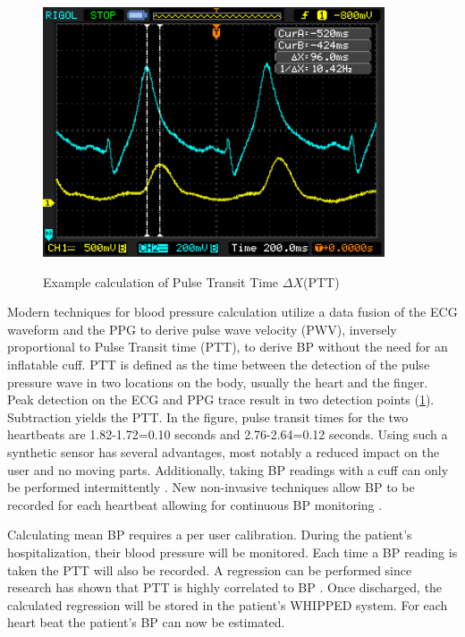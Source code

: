 \begin{figure}
	\begin{center}
		\label{fig:PTT_calc}
		\includegraphics[scale=1,width=0.9\textwidth]{Images/PTT_Calculation.png} 
		\caption{Example calculation of Pulse Transit Time $ \Delta X $(PTT)}
	\end{center}
\end{figure}

Modern techniques for blood pressure calculation utilize a data fusion of the ECG waveform and the PPG to derive pulse wave velocity (PWV), inversely proportional to Pulse Transit time (PTT), to derive BP without the need for an inflatable cuff.  PTT is defined as the time between the detection of the pulse pressure wave in two locations on the body, usually the heart and the finger. Peak detection on the ECG and PPG trace result in two detection points (\cref{fig:PTT_calc}). Subtraction yields the PTT. In the figure, pulse transit times for the two heartbeats are 1.82-1.72=0.10 seconds and 2.76-2.64=0.12 seconds. Using such a synthetic sensor has several advantages, most notably a reduced impact on the user and no moving parts. Additionally, taking BP readings with a cuff can only be performed intermittently \cite{DeMey1995}. New non-invasive techniques allow BP to be recorded for each heartbeat allowing for continuous BP monitoring \cite{Gesche2012}. 

Calculating mean BP requires a per user calibration. During the patient's hospitalization, their blood pressure will be monitored. Each time a BP reading is taken the PTT will also be recorded. A regression can be performed since research has shown that PTT is highly correlated to BP \cite{Chan2001}. Once discharged, the calculated regression will be stored in the patient's WHIPPED system. For each heart beat the patient's BP can now be estimated.  

